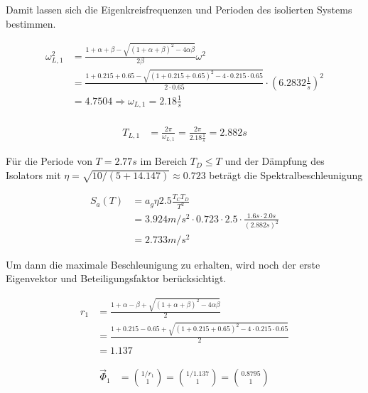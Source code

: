 Damit lassen sich die Eigenkreisfrequenzen und Perioden des isolierten Systems bestimmen.

\begin{align*}
\omega_{L,1}^2 &= \frac{1 + \alpha + \beta - \sqrt{(1 + \alpha + \beta)^2 - 4 \alpha \beta}}{2 \beta} \omega^2\\
               &= \frac{1 + 0.215 + 0.65 - \sqrt{(1 + 0.215 + 0.65)^2 - 4 \cdot 0.215 \cdot 0.65}}{2 \cdot 0.65} \cdot (6.2832 \frac{1}{s})^2\\
               &= 4.7504 \Rightarrow  \omega_{L,1} = 2.18 \frac{1}{s}\\
\end{align*}

\begin{align*}
T_{L,1} &= \frac{2 \pi}{\omega_{L,1}} = \frac{2 \pi}{2.18 \frac{1}{s}} = 2.882 s
\end{align*}

Für die Periode von $T = 2.77 s$ im Bereich $T_D \leq T$ und der Dämpfung des Isolators mit $\eta=\sqrt{10/(5+14.147)} \approx 0.723$ beträgt die Spektralbeschleunigung

\begin{align*}
S_a(T) &= a_g \eta 2.5 \frac{T_C T_D}{T^2}\\
       &= 3.924 m/s^2 \cdot 0.723 \cdot 2.5 \cdot \frac{1.6 s \cdot 2.0 s}{(2.882 s)^2}\\
       &= 2.733 m/s^2
\end{align*}

\pagebreak

Um dann die maximale Beschleunigung zu erhalten, wird noch der erste Eigenvektor und Beteiligungsfaktor berücksichtigt.

\begin{align*}
r_1 &= \frac{1 + \alpha - \beta + \sqrt{(1 + \alpha + \beta)^2 - 4 \alpha \beta}}{2} \\
    &= \frac{1 + 0.215 - 0.65 + \sqrt{(1 + 0.215 + 0.65)^2 - 4 \cdot 0.215 \cdot 0.65}}{2}\\
    &= 1.137
\end{align*}

\begin{align*}
\vec{\Phi}_1 &= \binom{1/r_1}{1} = \binom{1/1.137}{1} = \binom{0.8795}{1}
\end{align*}

